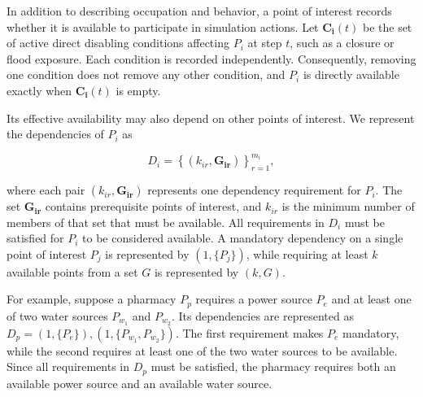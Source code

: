 In addition to describing occupation and behavior, a point of interest records whether it is available to participate in simulation actions. Let $\bm{C_i}(t)$ be the set of active direct disabling conditions %
affecting $P_i$ at step $t$, such as a closure or flood exposure. Each condition is recorded independently. Consequently, removing one condition does not remove any other condition, and $P_i$ is directly available exactly when $\bm{C_i}(t)$ is empty.

Its effective availability may also depend on other points of interest. We represent the dependencies of $P_i$ as

\begin{equation}
D_i=\left\{(k_{ir},\bm{G_{ir}})\right\}_{r=1}^{m_i},
\label{eq}
\end{equation}

where each pair $(k_{ir},\bm{G_{ir}})$ represents one dependency requirement for $P_i$. The set $\bm{G_{ir}}$ contains prerequisite points of interest, and $k_{ir}$ is the minimum number of members of that set that must be available. All requirements in $D_i$ must be satisfied for $P_i$ to be considered available. A mandatory dependency on a single point of interest $P_j$ is represented by $(1,\{{P_j}\})$, while requiring at least $k$ available points from a set $G$ is represented by $(k,G)$.

For example, suppose a pharmacy $P_p$ requires a power source $P_e$ and at least one of two water sources $P_{w_1}$ and $P_{w_2}$. Its dependencies are represented as $D_p={(1,\{{P_e}\}),(1,\{{P_{w_1},P_{w_2}}\})}$. The first requirement makes $P_e$ mandatory, while the second requires at least one of the two water sources to be available. Since all requirements in $D_p$ must be satisfied, the pharmacy requires both an available power source and an available water source.


